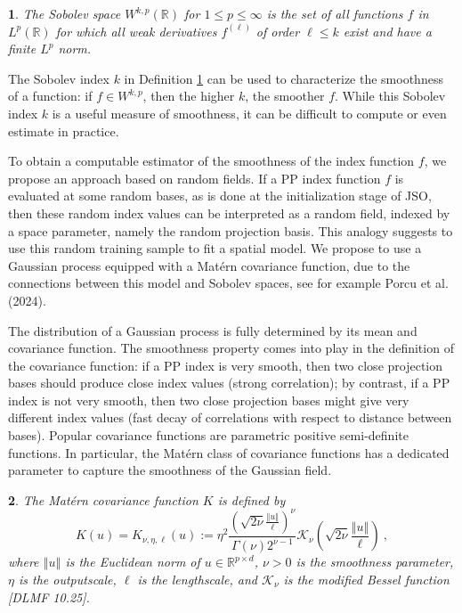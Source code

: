 \documentclass[
  12pt,
]{interact}
\theoremstyle{plain}
\newtheorem{defn}{\protect\definitionname}
\providecommand{\definitionname}{Definition}
\begin{document}
\begin{defn}\label{def:sobolev_space}
The Sobolev space $W^{k,p}(\mathbb{R})$ for $1\leq p\leq \infty$ is the set of all functions $f$ in $L^p(\mathbb{R})$ for which all weak derivatives $f^{(\ell)}$ of order $\ell\leq k$ exist and have a finite $L^p$ norm.
\end{defn}

The Sobolev index \(k\) in Definition \ref{def:sobolev_space} can be
used to characterize the smoothness of a function: if \(f\in W^{k,p}\),
then the higher \(k\), the smoother \(f\). While this Sobolev index
\(k\) is a useful measure of smoothness, it can be difficult to compute
or even estimate in practice.

To obtain a computable estimator of the smoothness of the index function
\(f\), we propose an approach based on random fields. If a PP index
function \(f\) is evaluated at some random bases, as is done at the
initialization stage of JSO, then these random index values can be
interpreted as a random field, indexed by a space parameter, namely the
random projection basis. This analogy suggests to use this random
training sample to fit a spatial model. We propose to use a Gaussian
process equipped with a Matérn covariance function, due to the
connections between this model and Sobolev spaces, see for example Porcu
et al. (2024).

The distribution of a Gaussian process is fully determined by its mean
and covariance function. The smoothness property comes into play in the
definition of the covariance function: if a PP index is very smooth,
then two close projection bases should produce close index values
(strong correlation); by contrast, if a PP index is not very smooth,
then two close projection bases might give very different index values
(fast decay of correlations with respect to distance between bases).
Popular covariance functions are parametric positive semi-definite
functions. In particular, the Matérn class of covariance functions has a
dedicated parameter to capture the smoothness of the Gaussian field.

\begin{defn}
The Matérn covariance function $K$ is defined by
\begin{equation}
K(u)=K_{\nu,\eta,\ell}(u):=\eta^2\frac{\left(\sqrt{2\nu}\frac{\left\Vert u\right\Vert}{\ell}\right)^{\nu}}{\Gamma(\nu)2^{\nu-1}}\mathcal{K}_{\nu}\left(\sqrt{2\nu}\frac{\left\Vert u\right\Vert}{\ell}\right)\ ,\label{eq:matern}
\end{equation}
where $\left\Vert u\right\Vert$ is the Euclidean norm of $u\in\mathbb{R}^{p{\times}d}$, $\nu>0$ is the smoothness parameter, $\eta$ is the outputscale, $\ell$ is the lengthscale, and $\mathcal{K}_\nu$ is
the modified Bessel function [DLMF 10.25].
\end{defn}
\end{document}
